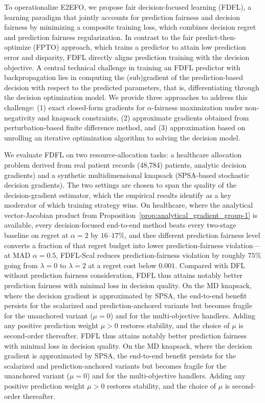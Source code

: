 \documentclass[ijoc,sglanonrev]{informs4}
\begin{document}
To operationalize E2EFO, we propose fair decision-focused learning (FDFL), a learning paradigm that jointly accounts for prediction fairness and decision fairness by minimizing a composite training loss, which combines decision regret and prediction fairness regularization. In contrast to the fair predict-then-optimize (FPTO) approach, which trains a predictor to attain low prediction error and disparity, FDFL directly aligns prediction training with the decision objective. A central technical challenge in training an FDFL predictor with backpropagation lies in computing the (sub)gradient of the prediction-based decision with respect to the predicted parameters, that is, differentiating through the decision optimization model. We provide three approaches to address this challenge: (1) exact closed-form gradients for $\alpha$-fairness maximization under non-negativity and knapsack constraints, (2) approximate gradients obtained from perturbation-based finite difference method, and (3) approximation based on unrolling an iterative optimization algorithm to solving the decision model. 

We evaluate FDFL on two resource-allocation tasks: a healthcare allocation problem derived from real patient records (48,784) patients, analytic decision gradients) and a synthetic multidimensional knapsack (SPSA-based stochastic decision gradients). The two settings are chosen to span the quality of the decision-gradient estimator, which the empirical results identify as a key moderator of which training strategy wins. On healthcare, where the analytical vector-Jacobian product from Proposition~\ref{prop:analytical_gradient_group-1} is available, every decision-focused end-to-end method beats every two-stage baseline on regret at $\alpha = 2$ by $ 16$--$17\%$, and thee different prediction fairness level converts a fraction of that regret budget into lower prediction-fairness violation---at MAD $\alpha = 0.5$, FDFL-Scal reduces prediction-fairness violation by roughly $75\%$ going from $\lambda = 0$ to $\lambda = 2$ at a regret cost below $0.001$. Compared with DFL without prediction fairness consideration, FDFL thus attains notably better prediction fairness with minimal loss in decision quality. On the MD knapsack, where the decision gradient is approximated by SPSA, the end-to-end benefit persists for the scalarized and prediction-anchored variants but becomes fragile for the unanchored variant ($\mu = 0$) and for the multi-objective handlers. Adding any positive prediction weight $\mu > 0$ restores stability, and the choice of $\mu$ is second-order thereafter.
FDFL thus attains notably better prediction fairness with minimal loss in decision quality. On the MD knapsack, where the decision gradient is approximated by SPSA, the end-to-end benefit persists for the scalarized and prediction-anchored variants but becomes fragile for the unanchored variant ($\mu = 0$) and for the multi-objective handlers. Adding any positive prediction weight $\mu > 0$ restores stability, and the choice of $\mu$ is second-order thereafter.
\end{document}
